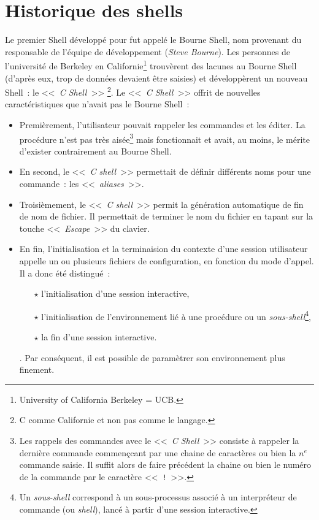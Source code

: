 \section{Historique des shells}

Le premier Shell d{\'e}velopp{\'e} pour {\Unix} fut appel{\'e} le
Bourne Shell, nom provenant du responsable
de l'{\'e}quipe de d{\'e}veloppement ({\sl Steve Bourne}). Les personnes
de l'universit{\'e} de Berkeley en Californie\footnote{University of
California Berkeley = UCB.} trouv{\`e}rent des lacunes au Bourne Shell
(d'apr{\`e}s eux, trop de donn{\'e}es devaient {\^e}tre saisies) et
d{\'e}velopp{\`e}rent un nouveau Shell~: le
<<~{\sl C Shell}~>> \footnote{C comme
Californie et non pas comme le langage.}. Le <<~{\sl C Shell}~>> offrit
de nouvelles caract{\'e}ristiques que n'avait pas le Bourne Shell~:
\begin{itemize}
	\item	Premi{\`e}rement, l'utilisateur pouvait rappeler les commandes et les {\'e}diter. La proc{\'e}dure
			n'est pas tr{\`e}s ais{\'e}e\footnote{Les rappels des commandes avec le <<~{\sl C Shell}~>> consiste
			{\`a} rappeler la derni{\`e}re commande commen\c{c}cant par une chaine de caract{\`e}res ou bien la $n^{e}$
			commande saisie. Il suffit alors de faire pr{\'e}c{\'e}dent la chaine ou bien le num{\'e}ro de la
			commande par le caract{\`e}re <<~{\tt !}~>>.} mais fonctionnait et avait, au moins, le m{\'e}rite d'exister
			contrairement au Bourne Shell.
	\item	En second, le <<~{\sl C shell}~>> permettait de d{\'e}finir diff{\'e}rents noms pour une
			commande~: les <<~{\sl aliases}~>>.
	\item	Troisi{\`e}mement, le <<~{\sl C shell}~>> permit la g{\'e}n{\'e}ration automatique
			de fin de nom de fichier. Il permettait de terminer le nom du fichier en tapant
			sur la touche <<~{\sl Escape}~>> du clavier.
	\item	En fin, l'initialisation et la terminaision du contexte d'une session utilisateur
			appelle un ou plusieurs fichiers de configuration, en fonction du mode d'appel.
			Il a donc {\'e}t{\'e} distingu{\'e}~:
			\begin{itemize}
				\item[$\star$] l'initialisation d'une session interactive,
				\item[$\star$] l'initialisation de l'environnement li{\'e} {\`a} une proc{\'e}dure ou
								un {\it sous-shell}\footnote{Un {\it sous-shell} correspond
								{\`a} un sous-processus associ{\'e} {\`a} un interpr{\'e}teur de commande
								(ou {\it shell}), lanc{\'e} {\`a} partir d'une session interactive.},
				\item[$\star$] la fin d'une session interactive.
			\end{itemize}.
			Par cons{\'e}quent, il est possible de param{\`e}trer son environnement plus finement.
\end{itemize}

